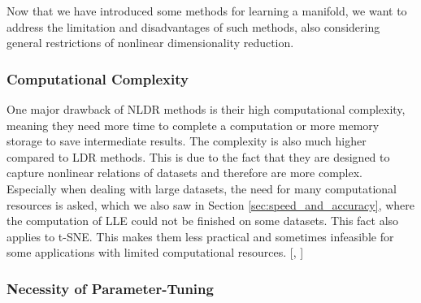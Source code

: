 Now that we have introduced some methods for learning a manifold, we want to address the limitation and disadvantages of such methods, also considering general restrictions of nonlinear dimensionality reduction.

\subsubsection{Computational Complexity}

One major drawback of NLDR methods is their high computational complexity, meaning they need more time to complete a computation or more memory storage to save intermediate results. The complexity is also much higher compared to LDR methods. This is due to the fact that they are designed to capture nonlinear relations of datasets and therefore are more complex. Especially when dealing with large datasets, the need for many computational resources is asked, which we also saw in Section \ref{sec:speed_and_accuracy}, where the computation of LLE could not be finished on some datasets. This fact also applies to t-SNE. This makes them less practical and sometimes infeasible for some applications with limited computational resources. [\cite{Zubova18}, \cite{t-SNE08}]

\subsubsection{Necessity of Parameter-Tuning} \label{subsubsec:parameter_tuning}


